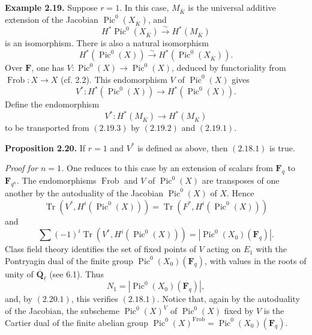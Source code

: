 \documentclass[11pt]{article}
\newcommand{\Qbar}{\overline{\mathbf Q}}
\newcommand{\Fq}{\mathbf F_q}
\newcommand{\F}{\mathbf F}
\newcommand{\Frob}{\operatorname{Frob}}
\newcommand{\Tr}{\operatorname{Tr}}
\newcommand{\Pic}{\operatorname{Pic}}
\begin{document}
\textbf{Example 2.19.} Suppose \(r=1\). In this case, \(M_{\overline K}\) is the universal additive extension of the Jacobian \(\Pic^0(X_{\overline K})\), and
\begin{equation}\tag{2.19.1}
H^*\Pic^0(X_{\overline K})\xrightarrow{\sim}H^*(M_{\overline K})
\end{equation}
is an isomorphism. There is also a natural isomorphism
\begin{equation}\tag{2.19.2}
H^*(\Pic^0(X))\xrightarrow{\sim}H^*(\Pic^0(X_{\overline K})).
\end{equation}
Over \(\F\), one has \(V:\Pic^0(X)\to\Pic^0(X)\), deduced by functoriality from \(\Frob:X\to X\) (cf. 2.2). This endomorphism \(V\) of \(\Pic^0(X)\) gives
\begin{equation}\tag{2.19.3}
V^*:H^*(\Pic^0(X))\to H^*(\Pic^0(X)).
\end{equation}
Define the endomorphism
\begin{equation}\tag{2.19.4}
V^*:H^*(M_{\overline K})\to H^*(M_{\overline K})
\end{equation}
to be transported from \((2.19.3)\) by \((2.19.2)\) and \((2.19.1)\).

\textbf{Proposition 2.20.} If \(r=1\) and \(V^*\) is defined as above, then \((2.18.1)\) is true.

\emph{Proof for \(n=1\).} One reduces to this case by an extension of scalars from \(\Fq\) to \(\mathbf F_{q^n}\). The endomorphisms \(\Frob\) and \(V\) of \(\Pic^0(X)\) are transposes of one another by the autoduality of the Jacobian \(\Pic^0(X)\) of \(X\). Hence
\[
\Tr(V^*,H^i(\Pic^0(X)))=\Tr(F^*,H^i(\Pic^0(X)))
\]
and
\begin{equation}\tag{2.20.1}
\sum (-1)^i\Tr(V^*,H^i(\Pic^0(X)))=|\Pic^0(X_0)(\Fq)|.
\end{equation}
Class field theory identifies the set of fixed points of \(V\) acting on \(E_1\) with the Pontryagin dual of the finite group \(\Pic^0(X_0)(\Fq)\), with values in the roots of unity of \(\Qbar_\ell\) (see 6.1). Thus
\begin{equation}\tag{2.20.2}
N_1=|\Pic^0(X_0)(\Fq)|,
\end{equation}
and, by \((2.20.1)\), this verifies \((2.18.1)\). Notice that, again by the autoduality of the Jacobian, the subscheme \(\Pic^0(X)^V\) of \(\Pic^0(X)\) fixed by \(V\) is the Cartier dual of the finite abelian group \(\Pic^0(X)^\Frob=\Pic^0(X_0)(\Fq)\).
\end{document}
